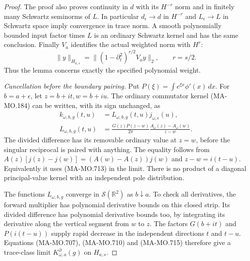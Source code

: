 \begin{proof}
The proof also proves continuity in \(d\) with its
\(H^{-r}\) norm and in finitely many Schwartz
seminorms of \(L\). In particular \(d_\epsilon\to d\)
in \(H^{-r}\) and \(L_\epsilon\to L\) in Schwartz
space imply convergence in trace norm. A smooth
polynomially bounded input factor times \(L\) is
an ordinary Schwartz kernel and has the same
conclusion. Finally \(V_a\) identifies the actual
weighted norm with \(H^r\):
\[
           \|y\|_{H_{a,s}}
                =\|(1-\partial_t^2)^{r/2}V_ay\|_2,
                          \qquad r=s/2 .
 \tag{MA-MO.717}
\]
Thus the lemma concerns exactly the specified
polynomial weight.

\emph{Cancellation before the boundary pairing.}
Put \(P(\xi)=\int e^{\xi x}\phi'(x)\,dx\).
For \(b=a+\epsilon\), let \(z=b+it,w=b+iu\).
The ordinary commutator kernel (MA-MO.184) can
be written, with its sign unchanged, as
\[
 \begin{aligned}
 k_{\omega,b,g}(t,u)&=L_{\omega,b,g}(t,u)
                                      j_{\omega,\epsilon}(u),\\
 L_{\omega,b,g}(t,u)
   &=\frac{G(z)P(z-w)}{2\pi}
                          \frac{A_\omega(z)-A_\omega(w)}{z-w}.
 \end{aligned}
 \tag{MA-MO.718}
\]
The divided difference has its removable ordinary
value at \(z=w\), before the singular reciprocal
is paired with anything. The equality follows from
\(A(z)[j(z)-j(w)]=(A(w)-A(z))j(w)\) and
\(z-w=i(t-u)\). Equivalently it uses (MA-MO.713)
in the limit. There is no product of a diagonal
principal-value kernel with an independent pole
distribution.

The functions \(L_{\omega,b,g}\) converge in
\(\mathscr S(\mathbb R^2)\) as \(b\downarrow a\).
To check all derivatives, the forward multiplier
has polynomial derivative bounds on this closed
strip. Its divided difference has polynomial
derivative bounds too, by integrating its derivative
along the vertical segment from \(w\) to \(z\).
The factors \(G(b+it)\) and \(P(i(t-u))\) supply
rapid decrease in the independent directions
\(t\) and \(t-u\). Equations (MA-MO.707),
(MA-MO.710) and (MA-MO.715) therefore give a
trace-class limit \(K_{\omega,a}^{\partial}(g)\)
on \(H_{a,s}\).


\end{proof}
